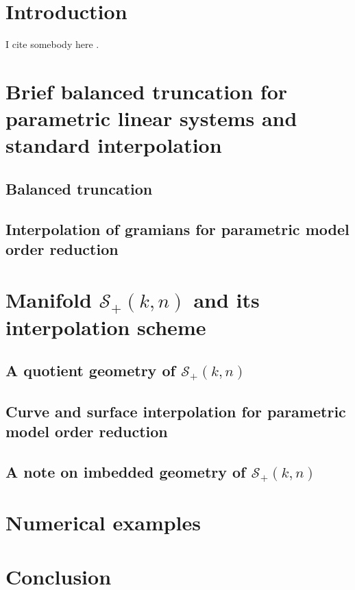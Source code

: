 \section{Introduction}\label{Sec:Intro}
I cite somebody here \cite{AbsiMS08}.
\section{Brief balanced truncation for parametric linear systems and standard interpolation}\label{Sec:BT_standard interpolation}
\subsection{Balanced truncation}
\subsection{Interpolation of gramians for parametric model order reduction}

\section{Manifold $\mathcal{S}_+(k,n)$ and its interpolation scheme}\label{Sec:Manifold}
\subsection{A quotient geometry of $\mathcal{S}_+(k,n)$}
\subsection{Curve and surface interpolation for parametric model order reduction}
\subsection{A note on imbedded geometry of $\mathcal{S}_+(k,n)$}

\section{Numerical examples}\label{Sec:NumerExam}


\section{Conclusion}\label{Sec:Concl}





%
%



